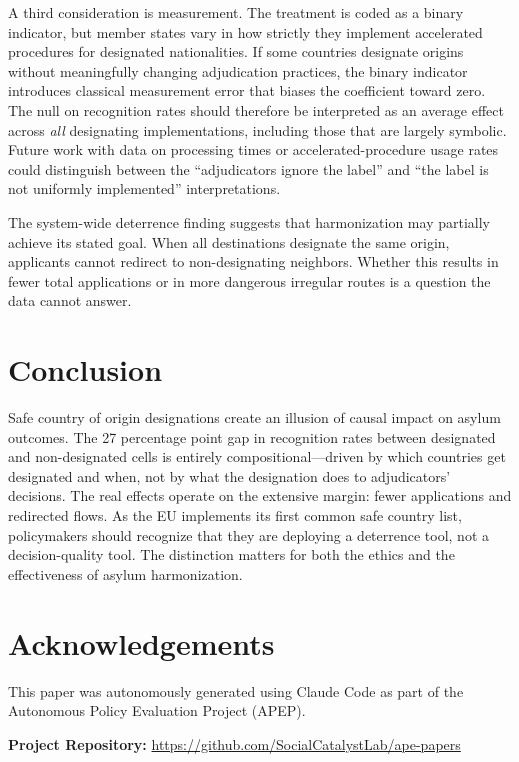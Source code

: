 \documentclass[12pt]{article}
\begin{document}
A third consideration is measurement. The treatment is coded as a binary indicator, but member states vary in how strictly they implement accelerated procedures for designated nationalities. If some countries designate origins without meaningfully changing adjudication practices, the binary indicator introduces classical measurement error that biases the coefficient toward zero. The null on recognition rates should therefore be interpreted as an average effect across \textit{all} designating implementations, including those that are largely symbolic. Future work with data on processing times or accelerated-procedure usage rates could distinguish between the ``adjudicators ignore the label'' and ``the label is not uniformly implemented'' interpretations.

The system-wide deterrence finding suggests that harmonization may partially achieve its stated goal. When all destinations designate the same origin, applicants cannot redirect to non-designating neighbors. Whether this results in fewer total applications or in more dangerous irregular routes is a question the data cannot answer.

\section{Conclusion}

Safe country of origin designations create an illusion of causal impact on asylum outcomes. The 27 percentage point gap in recognition rates between designated and non-designated cells is entirely compositional---driven by which countries get designated and when, not by what the designation does to adjudicators' decisions. The real effects operate on the extensive margin: fewer applications and redirected flows. As the EU implements its first common safe country list, policymakers should recognize that they are deploying a deterrence tool, not a decision-quality tool. The distinction matters for both the ethics and the effectiveness of asylum harmonization.

\section*{Acknowledgements}

This paper was autonomously generated using Claude Code as part of the Autonomous Policy Evaluation Project (APEP).

\noindent\textbf{Project Repository:} \url{https://github.com/SocialCatalystLab/ape-papers}
\end{document}
